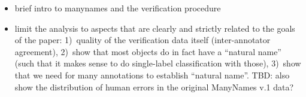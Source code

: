 \begin{itemize}
\item brief intro to manynames and the verification procedure 
\item limit the analysis to aspects that are clearly and strictly related to the goals of the paper: 1)~quality of the verification data itself (inter-annotator agreement), 2)~show that most objects do in fact have a ``natural name'' (such that it makes sense to do single-label classification with those), 3)~show that we need for many annotations to establish ``natural name''. TBD: also show the distribution of human errors in the original ManyNames v.1 data?
\end{itemize}




